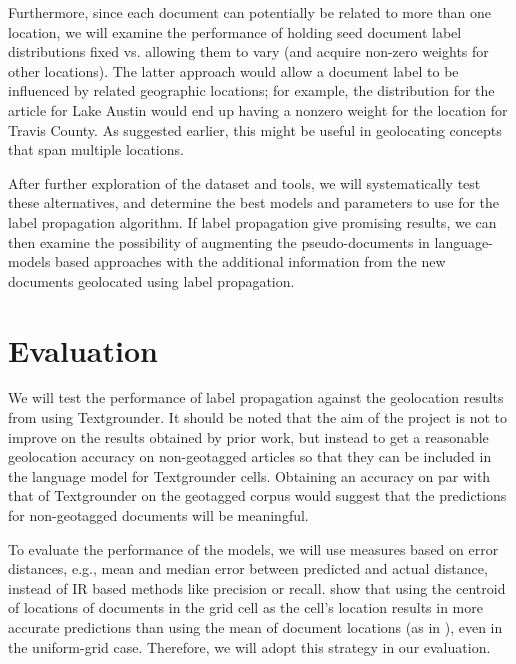 \documentclass[11pt]{article}
\newcommand{\comment}[1]{}
\begin{document}
Furthermore, since each document can potentially be related to more than one location, we will examine the performance of holding seed document label distributions fixed vs. allowing them to vary (and acquire non-zero weights for other locations).
The latter approach would allow a document label to be influenced by related geographic locations; 
for example, the distribution for the article for Lake Austin would end up having a nonzero weight for the location for Travis County.
As suggested earlier, this might be useful in geolocating concepts that span multiple locations.

After further exploration of the dataset and tools, we will systematically test these alternatives, and determine the best models and parameters to use for the label propagation algorithm.
If label propagation give promising results, we can then examine the possibility of augmenting the pseudo-documents in language-models based approaches with the additional information from the new documents geolocated using label propagation.



\section{Evaluation}
We will test the performance of label propagation against the geolocation results from \cite{wing-baldridge:11} using Textgrounder.
It should be noted that the aim of the project is not to improve on the results obtained by prior work, but instead to get a reasonable geolocation accuracy on non-geotagged articles so that they can be included in the language model for Textgrounder cells.
Obtaining an accuracy on par with that of Textgrounder on the geotagged corpus would suggest that the predictions for non-geotagged documents will be meaningful.

To evaluate the performance of the models, we will use measures based on error distances, e.g., mean and median error between predicted and actual distance, instead of IR based methods like precision or recall.
\cite{rolleretal:12} show that using the centroid of locations of documents in the grid cell as the cell's location results in more accurate predictions than using the mean of document locations (as in \cite{wing-baldridge:11}), even in the uniform-grid case.
Therefore, we will adopt this strategy in our evaluation.

\comment{I suggest we remove the next two sections: we're already running over the page limit! -Aidan}
\end{document}
